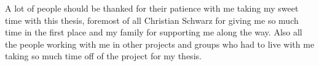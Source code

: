 \acknowledgements

A lot of people should be thanked for their patience with me taking my sweet time with this thesis, foremost of all Christian Schwarz for giving me so much time in the first place and my family for supporting me along the way. Also all the people working with me in other projects and groups who had to live with me taking so much time off of the project for my thesis.